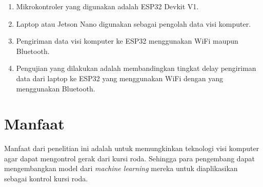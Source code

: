 \begin{enumerate}[nolistsep]

  \item Mikrokontroler yang digunakan adalah ESP32 Devkit V1.

  \item Laptop atau Jetson Nano digunakan sebagai pengolah data visi komputer.

  \item Pengiriman data visi komputer ke ESP32 menggunakan WiFi maupun Bluetooth.

  \item Pengujian yang dilakukan adalah membandingkan tingkat delay pengiriman data dari laptop ke ESP32 yang menggunakan WiFi dengan yang menggunakan Bluetooth.

\end{enumerate}

\section{Manfaat}
Manfaat dari penelitian ini adalah untuk memungkinkan teknologi visi komputer agar dapat mengontrol gerak dari kursi roda. Sehingga para pengembang dapat mengembangkan model dari \emph{machine learning} mereka untuk diaplikasikan sebagai kontrol kursi roda.